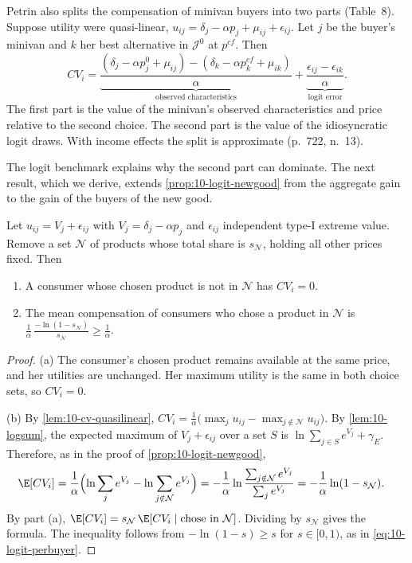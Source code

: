Petrin also splits the compensation of minivan buyers into two parts (Table~8). Suppose utility were quasi-linear,
$u_{ij} = \delta_j - \alpha p_j + \mu_{ij} + \epsilon_{ij}$. Let $j$ be the buyer's minivan and $k$ her best
alternative in $\mathcal{J}^0$ at $p^{cf}$. Then
\begin{equation}\label{eq:10-petrin-decomp}
  CV_i = \underbrace{\frac{(\delta_j - \alpha p^0_j + \mu_{ij}) - (\delta_k - \alpha p^{cf}_k + \mu_{ik})}{\alpha}}_{
  \text{observed characteristics}}
  + \underbrace{\frac{\epsilon_{ij} - \epsilon_{ik}}{\alpha}}_{\text{logit error}} .
\end{equation}
The first part is the value of the minivan's observed characteristics and price relative to the second choice. The
second part is the value of the idiosyncratic logit draws. With income effects the split is approximate (p.~722,
n.~13).

The logit benchmark explains why the second part can dominate. The next result, which we derive, extends
\cref{prop:10-logit-newgood} from the aggregate gain to the gain of the buyers of the new good.

\begin{proposition}\label{prop:10-logit-buyer-cv}
Let $u_{ij} = V_j + \epsilon_{ij}$ with $V_j = \delta_j - \alpha p_j$ and $\epsilon_{ij}$ independent type-I extreme
value. Remove a set $\mathcal{N}$ of products whose total share is $s_{\mathcal{N}}$, holding all other prices fixed.
Then
\begin{enumerate}[label=(\alph*)]
  \item A consumer whose chosen product is not in $\mathcal{N}$ has $CV_i = 0$.
  \item The mean compensation of consumers who chose a product in $\mathcal{N}$ is
        $\frac{1}{\alpha}\,\frac{-\ln(1 - s_{\mathcal{N}})}{s_{\mathcal{N}}} \ge \frac{1}{\alpha}$.
\end{enumerate}
\end{proposition}

\begin{proof}
(a) The consumer's chosen product remains available at the same price, and her utilities are unchanged. Her maximum
utility is the same in both choice sets, so $CV_i = 0$.

(b) By \cref{lem:10-cv-quasilinear}, $CV_i = \frac{1}{\alpha}\bigl(\max_{j}u_{ij} - \max_{j\notin\mathcal{N}}u_{ij}\bigr)$.
By \cref{lem:10-logsum}, the expected maximum of $V_j + \epsilon_{ij}$ over a set $S$ is $\ln\sum_{j\in S}e^{V_j} +
\gamma_E$. Therefore, as in the proof of \cref{prop:10-logit-newgood},
\begin{align*}
  \E[CV_i] &= \frac{1}{\alpha}\Bigl(\ln\sum_{j}e^{V_j} - \ln\sum_{j\notin\mathcal{N}}e^{V_j}\Bigr)
            = -\frac{1}{\alpha}\ln\frac{\sum_{j\notin\mathcal{N}}e^{V_j}}{\sum_{j}e^{V_j}}
            = -\frac{1}{\alpha}\ln(1 - s_{\mathcal{N}}) .
\end{align*}
By part (a), $\E[CV_i] = s_{\mathcal{N}}\,\E[CV_i \mid \text{chose in } \mathcal{N}]$. Dividing by $s_{\mathcal{N}}$ gives
the formula. The inequality follows from $-\ln(1-s) \ge s$ for $s \in [0,1)$, as in \eqref{eq:10-logit-perbuyer}.
\end{proof}

